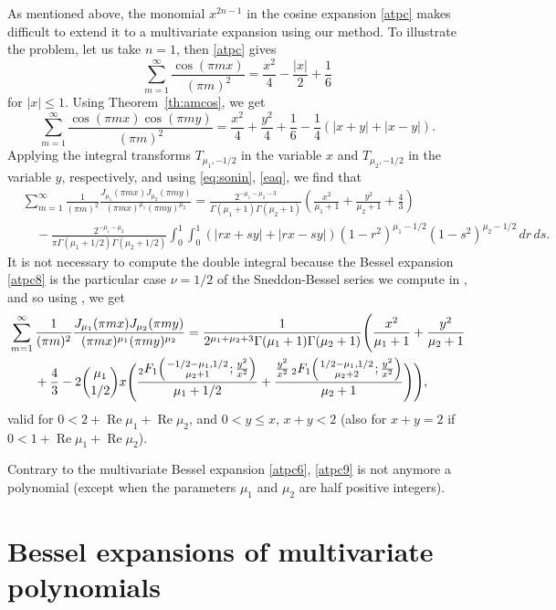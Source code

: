 \documentclass[12pt,leqno]{amsart}
\numberwithin{equation}{section}
\theoremstyle{plain}
\renewcommand{\Re}{\operatorname{Re}}
\newcommand{\FF}[3]{{}_{2}F_{1}%
  \mathopen{}\left(\genfrac{}{}{0pt}{}{#1}{#2};#3\right)\mathclose{}}
\begin{document}
As mentioned above, the monomial $x^{2n-1}$ in the cosine expansion \eqref{atpc} makes difficult to extend it to a multivariate expansion using our method. To illustrate the problem, let us take $n=1$, then \eqref{atpc} gives
\[
\sum_{m=1}^{\infty} \frac{\cos(\pi mx)}{(\pi m)^{2}}
= \frac{x^2}{4}-\frac{|x|}{2}+\frac{1}{6}
\]
for $|x| \leq 1$. Using Theorem~\ref{th:amcos}, we get
\[
\sum_{m=1}^{\infty} \frac{\cos(\pi mx) \cos(\pi my)}{(\pi m)^{2}}
= \frac{x^2}{4} + \frac{y^2}{4} + \frac{1}{6} - \frac{1}{4}(|x+y| + |x-y|).
\]
Applying the integral transforms $T_{\mu_1,-1/2}$ in the variable $x$ and $T_{\mu_2,-1/2}$ in the variable $y$, respectively, and using \eqref{eq:sonin}, \eqref{eaq}, we find that
\begin{align}
\label{atpc8}
& \sum_{m=1}^{\infty} \frac{1}{(\pi m)^{2}}
\frac{J_{\mu_1}(\pi mx)J_{\mu_2}(\pi my)}{(\pi mx)^{\mu_1}(\pi my)^{\mu_2}}
= \frac{2^{-\mu_1-\mu_2-3}}{\Gamma(\mu_1+1)\Gamma(\mu_2+1)}
\left(\frac{x^2}{\mu_1+1}+\frac{y^2}{\mu_2+1}+\frac{4}{3}\right) \\
\nonumber
&\quad - \frac{2^{-\mu_1-\mu_2}}{\pi\Gamma(\mu_1+1/2)\Gamma(\mu_2+1/2)}
\int_0^1 \int_0^1 (|rx+sy| + |rx-sy|) (1-r^2)^{\mu_1-1/2}(1-s^2)^{\mu_2-1/2}\,dr\,ds.
\end{align}
It is not necessary to compute the double integral because the Bessel expansion \eqref{atpc8} is the particular case $\nu=1/2$ of the Sneddon-Bessel series we compute in \cite{DPVS}, and so using \cite[Sect.~4.1.2]{DPVS}, we get
\begin{align}
\label{atpc9}
& \sum_{m=1}^{\infty} \frac{1}{(\pi m)^{2}}
\frac{J_{\mu_1}(\pi mx)J_{\mu_2}(\pi my)}{(\pi mx)^{\mu_1}(\pi my)^{\mu_2}}
= \frac{1}{2^{\mu_1+\mu_2+3} \Gamma(\mu_1+1)\Gamma(\mu_2+1)}
\Bigg( \frac{x^2}{\mu_1+1}+\frac{y^2}{\mu_2+1} \\
\nonumber
&\qquad \null+ \frac{4}{3}-2 \binom{\mu_1}{1/2}x \Bigg(
   \frac{\FF{-1/2-\mu_1,1/2}{\mu_2+1}{\frac{y^2}{x^2}}}{\mu_1+1/2}
   + \frac{\frac{y^2}{x^2} \,\FF{1/2-\mu_1,1/2}{\mu_2+2}{\frac{y^2}{x^2}}}{\mu_2+1}
\Bigg)\Bigg),
\end{align}
valid for $0<2+\Re\mu_1+\Re\mu_2$, and $0<y\le x$, $x+y<2$ (also for $x+y=2$ if $0<1+\Re\mu_1+\Re\mu_2$).

Contrary to the multivariate Bessel expansion \eqref{atpc6}, \eqref{atpc9} is not anymore a polynomial (except when the parameters $\mu_1$ and $\mu_2$ are half positive integers).

\section{Bessel expansions of multivariate polynomials}
\label{sec:multipol}
\end{document}

